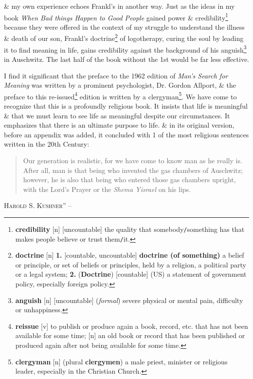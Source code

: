 \documentclass[oneside]{book}
\numberwithin{equation}{section}
\begin{document}
\& my own experience echoes Frankl's in another way. Just as the ideas in my book \textit{When Bad things Happen to Good People} gained power \& credibility\footnote{\textbf{credibility} [n] [uncountable] the quality that somebody\texttt{/}something has that makes people believe or trust them\texttt{/}it.} because they were offered in the context of my struggle to understand the illness \& death of our son, Frankl's doctrine\footnote{\textbf{doctrine} [n] \textbf{1.} [countable, uncountable] \textbf{doctrine (of something)} a belief or principle, or set of beliefs or principles, held by a religion, a political party or a legal system; \textbf{2.} (\textbf{Doctrine}) [countable] (US) a statement of government policy, especially foreign policy.} of logotherapy, curing the soul by leading it to find meaning in life, gains credibility against the background of his anguish\footnote{\textbf{anguish} [n] [uncountable] (\textit{formal}) severe physical or mental pain, difficulty or unhappiness.} in Auschwitz. The last half of the book without the 1st would be far less effective.

I find it significant that the preface to the 1962 edition of \textit{Man's Search for Meaning} was written by a prominent psychologist, Dr. Gordon Allport, \& the preface to this re-issued\footnote{\textbf{reissue} [v] to publish or produce again a book, record, etc. that has not been available for some time; [n] an old book or record that has been published or produced again after not being available for some time.} edition is written by a clergyman\footnote{\textbf{clergyman} [n] (plural \textbf{clergymen}) a male priest, minister or religious leader, especially in the Christian Church.}. We have come to recognize that this is a profoundly religious book. It insists that life is meaningful \& that we must learn to see life as meaningful despite our circumstances. It emphasizes that there is an ultimate purpose to life. \& in its original version, before an appendix was added, it concluded with 1 of the most religious sentences written in the 20th Century:
\begin{quotation}
	Our generation is realistic, for we have come to know man as he really is. After all, man is that being who invented the gas chambers of Auschwitz; however, he is also that being who entered those gas chambers upright, with the Lord's Prayer or the \textit{Shema Yisrael} on his lips.
\end{quotation}
\textsc{Harold S. Kushner}'' -- \cite[pp. 9--10]{Frankl2013}
\end{document}
